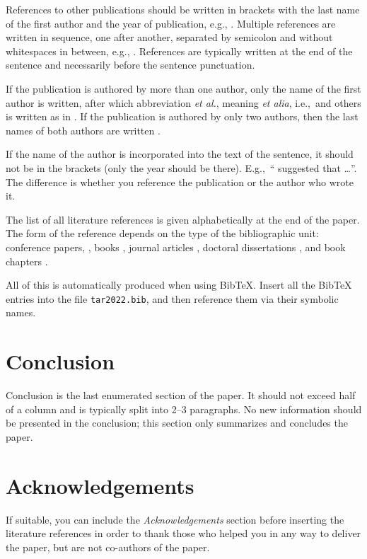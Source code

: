 \documentclass[10pt, a4paper]{article}
\begin{document}
References to other publications should be written in brackets with the last name of the first author and the year of publication, e.g., \citep{chomsky-73}.  Multiple references are written in sequence, one after another, separated by semicolon and without whitespaces in between, e.g., \citep{chomsky-73,chave-64,feigl-58}. References are typically written at the end of the sentence and necessarily before the sentence punctuation.

If the publication is authored by more than one author, only the name of the first author is written, after which abbreviation \emph{et al.}, meaning \emph{et alia}, i.e.,~and others is written as in \citep{johnson-etc}. If the publication is authored by only two authors, then the last names of both authors are written \citep{johnson-howells}.

If the name of the author is incorporated into the text of the sentence, it should not be in the brackets (only the year should be there). E.g.,~``\citet{chomsky-73}
suggested that \dots''. The difference is whether you reference the publication or the author who wrote it. 

The list of all literature references is given alphabetically at the end of the paper. The form of the reference depends on the type of the bibliographic unit: conference papers,
\citep{chave-64}, books \citep{butcher-81}, journal articles
\citep{howells-51}, doctoral dissertations \citep{croft-78}, and book chapters \citep{feigl-58}. 

All of this is automatically produced when using BibTeX. Insert all the BibTeX entries into the file \texttt{tar2022.bib}, and then reference them via their symbolic names.

\section{Conclusion}

Conclusion is the last enumerated section of the paper. It should not exceed half of a column and is typically split into 2--3 paragraphs. No new information should be presented in the conclusion; this section only summarizes and concludes the paper.

\section*{Acknowledgements}

If suitable, you can include the \textit{Acknowledgements} section before inserting the literature references  in order to thank those who helped you in any way to deliver the paper, but are not co-authors of the paper.


 
\end{document}
